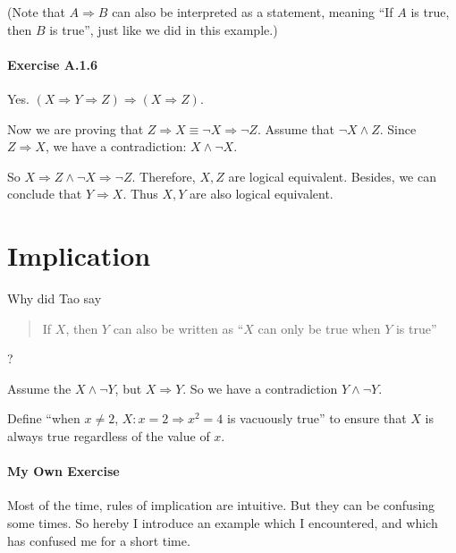 (Note that $A \Longrightarrow B$ can also be interpreted as a statement, meaning ``If $A$ is true, then $B$ 
is true'', just like we did in this example.)

\paragraph{Exercise A.1.6}
\label{exercisea.1.6}
Yes. $(X \Longrightarrow Y \Longrightarrow Z) \Longrightarrow (X \Longrightarrow Z)$. 

Now we are proving that 
$Z \Longrightarrow X \equiv \neg X \Longrightarrow \neg Z$. Assume that $\neg X \wedge Z$. Since 
$Z \Longrightarrow X$, we have a contradiction: $X \wedge \neg X$.

So $X \Longrightarrow Z \wedge \neg X \Longrightarrow \neg Z$. Therefore, $X,Z$ are logical equivalent. 
Besides, we can conclude that $Y \Longrightarrow X$. Thus $X,Y$ are also logical equivalent.

\section{Implication}
Why did Tao say
\begin{quotation}
If $X$, then $Y$ can also be written as ``$X$ can only be true when $Y$ is true''
\end{quotation}?

Assume the $X \wedge \neg Y$, but $X \Longrightarrow Y$. So we have a contradiction 
$Y \wedge \neg Y$.

Define ``when $x \neq 2$, $X:x=2 \Longrightarrow x^2=4$ is vacuously true'' to ensure that $X$ is 
always true regardless of the value of $x$.

\paragraph{My Own Exercise}
Most of the time, rules of implication are intuitive. But they can be confusing some times. So hereby I 
introduce an example which I encountered, and which has confused me for a short time.

